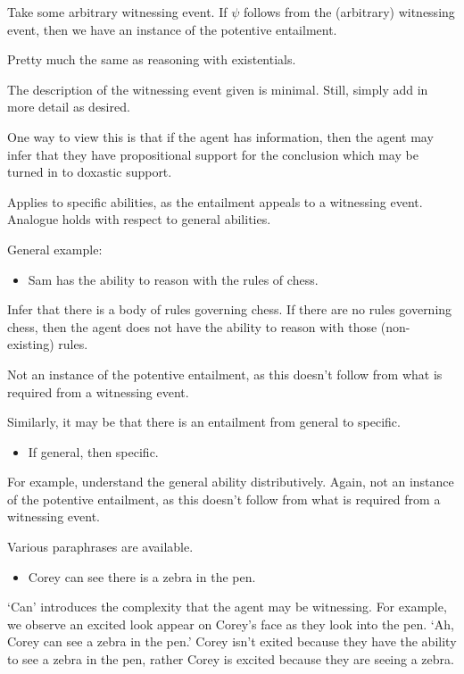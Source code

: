 \begin{note}
  Take some arbitrary witnessing event.
  If \(\psi\) follows from the (arbitrary) witnessing event, then we have an instance of the potentive entailment.

  Pretty much the same as reasoning with existentials.
\end{note}

\begin{note}
  The description of the witnessing event given is minimal.
  Still, simply add in more detail as desired.
\end{note}


\begin{note}
  One way to view this is that if the agent has information, then the agent may infer that they have propositional support for the conclusion which may be turned in to doxastic support.
\end{note}

\begin{note}
  Applies to specific abilities, as the entailment appeals to a witnessing event.
  Analogue holds with respect to general abilities.

  General example:
  \begin{itemize}
  \item Sam has the ability to reason with the rules of chess.
  \end{itemize}
  Infer that there is a body of rules governing chess.
  If there are no rules governing chess, then the agent does not have the ability to reason with those (non-existing) rules.

  Not an instance of the potentive entailment, as this doesn't follow from what is required from a witnessing event.

  Similarly, it may be that there is an entailment from general to specific.
  \begin{itemize}
  \item If general, then specific.
  \end{itemize}
  For example, understand the general ability distributively.
  Again, not an instance of the potentive entailment, as this doesn't follow from what is required from a witnessing event.
\end{note}

\begin{note}
  Various paraphrases are available.
  \begin{itemize}
  \item Corey can see there is a zebra in the pen.
  \end{itemize}
  `Can' introduces the complexity that the agent may be witnessing.
  For example, we observe an excited look appear on Corey's face as they look into the pen.
  `Ah, Corey can see a zebra in the pen.'
  Corey isn't exited because they have the ability to see a zebra in the pen, rather Corey is excited because they are seeing a zebra.
\end{note}

